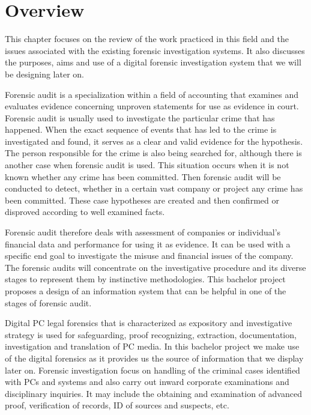 \chapter{Overview} \label{Overview}


This chapter focuses on the review of the work practiced in this field and the issues associated with the existing forensic investigation systems. It also discusses the purposes, aims and use of a digital forensic investigation system that we will be designing later on. 

Forensic audit is a specialization within a field of accounting that examines and evaluates evidence concerning unproven statements for use as evidence in court. Forensic audit is usually used to investigate the particular crime that has happened. When the exact sequence of events that has led to the crime is investigated and found, it serves as a clear and valid evidence for the hypothesis. The person responsible for the crime is also being searched for, although there is another case when forensic audit is used. This situation occurs when it is not known whether any crime has been committed. Then forensic audit will be conducted to detect, whether in a certain vast company or project any crime has been committed. These case hypotheses are created and then confirmed or disproved according to well examined facts.

Forensic audit therefore deals with assessment of companies or individual's financial data and performance for using it as evidence. It can be used with a specific end goal to investigate the misuse and financial issues of the company. The forensic audits will concentrate on the investigative procedure and its diverse stages to represent them by instinctive methodologies. This bachelor project proposes a design of an information system that can be helpful in one of the stages of forensic audit. 



Digital PC legal forensics that is characterized as expository and investigative strategy is used for safeguarding, proof recognizing, extraction, documentation, investigation and translation of PC media. In this bachelor project we make use of the digital forensics as it provides us the source of information that we display later on. Forensic investigation focus on handling of the criminal cases identified with PCs and systems and also carry out inward corporate examinations and disciplinary inquiries. It may include the obtaining and examination of advanced proof, verification of records, ID of sources and suspects, etc. 


